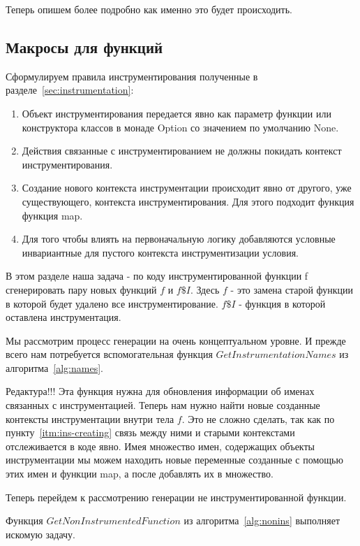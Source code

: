 Теперь опишем более подробно как именно это будет происходить.

\subsection{Макросы для функций}
\label{sec:macroFunction}

Сформулируем правила инструментирования полученные в
разделе~\ref{sec:instrumentation}:
\begin{enumerate}
  \item
  \label{itm:ins-constructor}
  Объект инструментирования передается явно как параметр функции или
  конструктора классов в монаде Option со значением по умолчанию None.
  \item
  \label{itm:ins-context}
  Действия связанные с инструментированием не должны покидать контекст
  инструментирования.
  \item
  \label{itm:ins-creating}
  Создание нового контекста инструментации происходит явно от другого,
  уже существующего, контекста инструментирования.
  Для этого подходит функция функция map.
  \item
  \label{itm:ins-logic}
  Для того чтобы влиять на первоначальную логику добавляются условные
  инвариантные для пустого контекста инструментизации условия.
\end{enumerate}


В этом разделе наша задача - по коду инструментированной функции f сгенерировать
пару новых функций $f$ и $f\$I$.
Здесь $f$ - это замена старой функции в которой будет удалено
все инструментирование.
$f\$I$ - функция в которой оставлена инструментация.

Мы рассмотрим процесс генерации на очень концептуальном уровне.
И прежде всего нам потребуется вспомогательная функция $GetInstrumentationNames$
из алгоритма~\ref{alg:names}.

Редактура!!!
Эта функция нужна для обновления информации об именах связанных с инструментацией.
Теперь нам нужно найти новые созданные контексты инструментации внутри тела $f$.
Это не сложно сделать, так как по пункту~\ref{itm:ins-creating} связь между ними
и старыми контекстами отслеживается в коде явно.
Имея множество имен, содержащих объекты инструментации мы можем находить новые
переменные созданные с помощью этих имен и функции map, а после добавлять их в
множество.

Теперь перейдем к рассмотрению генерации не инструментированной функции.

Функция $GetNonInstrumentedFunction$ из алгоритма~\ref{alg:nonins}
выполняет искомую задачу.

